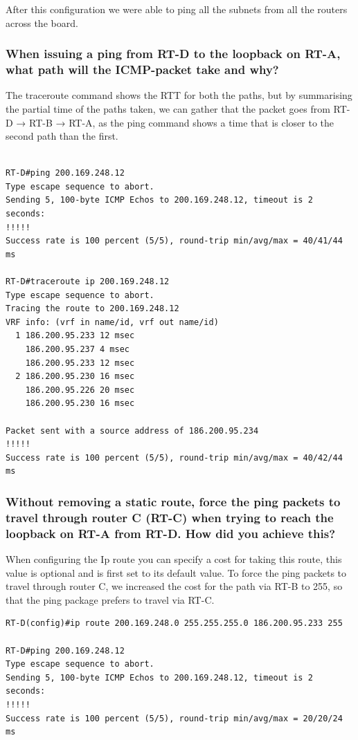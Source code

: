 \documentclass[a4paper, titlepage,12pt]{article}
\begin{document}
		After this configuration we were able to ping all the subnets from all the routers across the board.

		\subsubsection{When issuing a ping from RT-D to the loopback on RT-A, what path will the ICMP-packet take and why?}

		The traceroute command shows the RTT for both the paths, but by summarising the partial time of the paths taken, we can gather that the packet goes from RT-D → RT-B → RT-A, as the ping command shows a time that is closer to the second path than the first.

\begin{verbatim}

RT-D#ping 200.169.248.12
Type escape sequence to abort.
Sending 5, 100-byte ICMP Echos to 200.169.248.12, timeout is 2 seconds:
!!!!!
Success rate is 100 percent (5/5), round-trip min/avg/max = 40/41/44 ms

RT-D#traceroute ip 200.169.248.12
Type escape sequence to abort.
Tracing the route to 200.169.248.12
VRF info: (vrf in name/id, vrf out name/id)
  1 186.200.95.233 12 msec
    186.200.95.237 4 msec
    186.200.95.233 12 msec
  2 186.200.95.230 16 msec
    186.200.95.226 20 msec
    186.200.95.230 16 msec

Packet sent with a source address of 186.200.95.234
!!!!!
Success rate is 100 percent (5/5), round-trip min/avg/max = 40/42/44 ms

\end{verbatim}

		\subsubsection{Without removing a static route, force the ping packets to travel through router C (RT-C) when trying to reach the loopback on RT-A from RT-D. How did you achieve this?}

		When configuring the Ip route you can specify a cost for taking this route, this value is optional and is first set to its default value. To force the ping packets to travel through router C, we increased the cost for the path via RT-B to 255, so that the ping package prefers to travel via RT-C. 

\begin{verbatim}
RT-D(config)#ip route 200.169.248.0 255.255.255.0 186.200.95.233 255

RT-D#ping 200.169.248.12
Type escape sequence to abort.
Sending 5, 100-byte ICMP Echos to 200.169.248.12, timeout is 2 seconds:
!!!!!
Success rate is 100 percent (5/5), round-trip min/avg/max = 20/20/24 ms
\end{verbatim}
\end{document}
